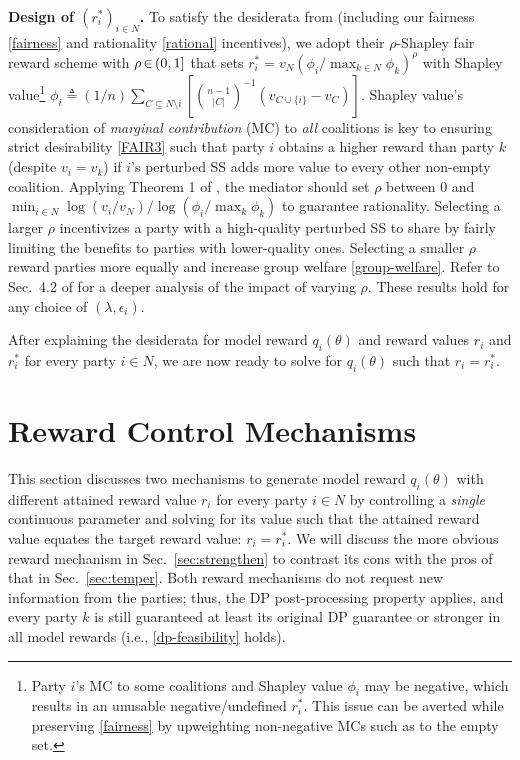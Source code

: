 \documentclass{article}
\DeclareRobustCommand{\hlp}[1]
{{#1}}
\theoremstyle{plain}
\theoremstyle{definition}
\theoremstyle{remark}
\renewcommand{\citet}[1]{\cite{#1}}
\begin{document}
\textbf{Design of $(r^*_i)_{i \in N}$.} To satisfy the desiderata from \cite{simcollaborative} (including our fairness \ref{fairness} and rationality \ref{rational} incentives), we adopt their $\rho$-Shapley fair reward scheme with $\rho\hspace{-0.45mm}\in\hspace{-0.45mm}(0, 1]$ that sets $r^*_i = v_N (\phi_i / \max_{k\in N} \phi_k )^\rho$ with Shapley value\footnote{\label{rasa} Party $i$'s MC to some coalitions and Shapley value $\phi_i$ may be negative, which results in an unusable negative/undefined $r^*_i$. This issue can be averted while preserving \ref{fairness} by upweighting non-negative MCs such as to the empty set.}
$ \phi_i \triangleq  \textstyle \left({1}/{n}\right)
\sum_{C \subseteq N \setminus i} 
\left[ {{n-1} \choose |C|}^{-1} 
\left( v_{C \cup \{i\}} - v_C \right) \right] $.
Shapley value's consideration of \emph{marginal contribution} (MC) to \emph{all} coalitions 
is key to ensuring strict desirability \ref{FAIR3} such that party $i$ 
obtains a higher reward than party $k$ (despite $v_i = v_k$) if $i$'s perturbed SS adds more value to every other non-empty coalition. 
Applying Theorem 1 of \citet{simcollaborative}, the mediator should set $\rho$ between $0$ and $\min_{i \in N}{{\log(v_{i}/v_N)}/{\log(\phi_i/\max_k\phi_k)}}$ to guarantee rationality.
Selecting a larger $\rho$ incentivizes a party with a high-quality perturbed SS to share by fairly limiting the benefits to %
parties with lower-quality ones.
Selecting a smaller $\rho$ reward parties more equally
and increase group welfare \ref{group-welfare}. Refer to Sec.~4.2 of \citet{simcollaborative} for a deeper analysis of the impact of varying $\rho$. These results hold for any choice of $(\lambda, \epsilon_i)$.


After explaining the desiderata for model reward $q_i(\theta)$ and reward values $r_i$ and $r^*_i$ for every party $i \in N$, we are now ready to solve for $q_i(\theta)$ such that $r_i = r^*_i$.


\section{Reward Control Mechanisms}
\label{sec:mechanism}
This section discusses two mechanisms to generate model reward $q_i(\theta)$ with different 
attained reward value $r_i$ for every party $i \in N$ by controlling a \emph{single} continuous parameter and solving for its value such that the attained reward value equates the target reward value: $r_i = r^*_i$. 
We will discuss the more obvious reward mechanism in
Sec.~\ref{sec:strengthen} to contrast its cons with the pros of that in Sec.~\ref{sec:temper}.
\hlp{Both reward mechanisms do not request new information from the parties; thus, the DP post-processing property applies, and every party $k$ is still guaranteed at least its original DP guarantee or stronger in all model rewards} (i.e., \ref{dp-feasibility} holds). 
\end{document}
